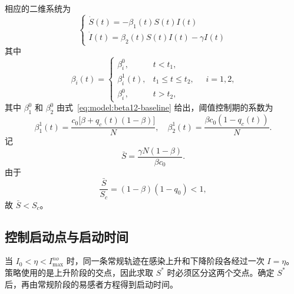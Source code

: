 \documentclass[UTF8,a4paper,10pt,fontset=fandol]{ctexart}
\theoremstyle{cnplain}
\theoremstyle{remark}
\numberwithin{equation}{section}
\begin{document}
相应的二维系统为
\begin{equation}
\begin{cases}
\dot{S}(t) = - \beta_1(t) S(t) I(t) \\
\dot{I}(t) = \beta_2(t) S(t) I(t) - \gamma I(t)
\end{cases}
\label{eq:s1:dynamics}
\end{equation}
其中
\begin{equation}
\beta_i(t)=
\begin{cases}
\beta_i^0, & t<t_1,\\
\beta_i^1(t), & t_1\le t\le t_2,\\
\beta_i^0, & t>t_2,
\end{cases}
\quad i=1,2,
\end{equation}
其中 $\beta_1^0$ 和 $\beta_2^0$ 由式~\eqref{eq:model:beta12-baseline} 给出，阈值控制期的系数为
\begin{equation}
\beta_1^1(t)=\frac{c_0\big[\beta+q_c(t)(1-\beta)\big]}{N},
\quad
\beta_2^1(t)=\frac{\beta c_0(1-q_c(t))}{N}.
\label{eq:s1:beta12-control}
\end{equation}
记
\begin{equation}
\bar S
=
\frac{\gamma N(1-\beta)}{\beta c_0}.
\label{eq:s1:barS}
\end{equation}
由于
\[
\frac{\bar S}{S_c}
=
(1-\beta)(1-q_0)<1,
\]
故 $\bar S<S_c$。

\subsection{控制启动点与启动时间}
当 $I_0<\eta<I_{\max}^{no}$ 时，同一条常规轨迹在感染上升和下降阶段各经过一次 $I=\eta$。策略使用的是上升阶段的交点，因此求取 $S^*$ 时必须区分这两个交点。确定 $S^*$ 后，再由常规阶段的易感者方程得到启动时间。
\end{document}
